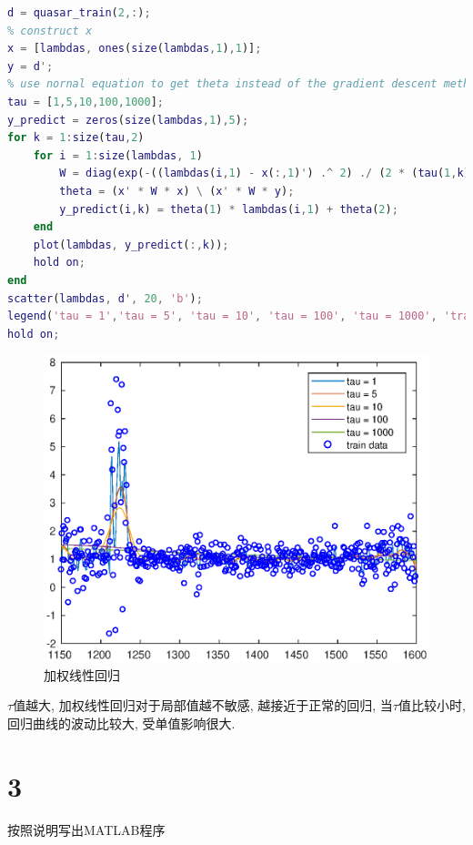 \documentclass{ctexart}
\begin{document}
\begin{lstlisting}[language = MATLAB]
d = quasar_train(2,:);
% construct x 
x = [lambdas, ones(size(lambdas,1),1)];
y = d';
% use nornal equation to get theta instead of the gradient descent method
tau = [1,5,10,100,1000];
y_predict = zeros(size(lambdas,1),5);
for k = 1:size(tau,2)
	for i = 1:size(lambdas, 1)
		W = diag(exp(-((lambdas(i,1) - x(:,1)') .^ 2) ./ (2 * (tau(1,k) ^ 2))));
		theta = (x' * W * x) \ (x' * W * y);
		y_predict(i,k) = theta(1) * lambdas(i,1) + theta(2);
	end
	plot(lambdas, y_predict(:,k));
	hold on;
end
scatter(lambdas, d', 20, 'b');
legend('tau = 1','tau = 5', 'tau = 10', 'tau = 100', 'tau = 1000', 'train data');
hold on;
\end{lstlisting}

\begin{figure}[ht]
	\includegraphics[width = \textwidth]{weight_linear_regression.eps}
	\caption{加权线性回归}
	\label{logistic}
\end{figure}

$\tau$值越大, 加权线性回归对于局部值越不敏感, 越接近于正常的回归, 当$\tau$值比较小时, 回归曲线的波动比较大, 受单值影响很大.

\section{3}

按照说明写出MATLAB程序
\end{document}

